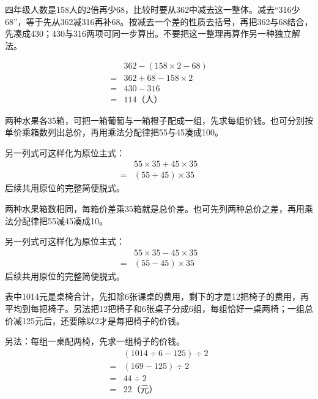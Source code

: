 \documentclass[multi=snippet,border=0pt]{standalone}
\newenvironment{snippet}[3]{\begin{minipage}{#1bp}\color{answerred}\fontsize{#2}{#3}\selectfont\raggedright}{\end{minipage}}
\begin{document}
\begin{snippet}{505}{11.5}{14}四年级人数是158人的2倍再少68，比较时要从362中减去这一整体。减去“316少68”，等于先从362减316再补68。按减去一个差的性质去括号，再把362与68结合，先凑成430；430与316两项可同一步算出。不要把这一整理再算作另一种独立解法。\end{snippet}
\begin{snippet}{179}{10.5}{12.8}\[\begin{aligned}&362-(158\times2-68)\\={}&362+68-158\times2\\={}&430-316\\={}&114\text{（人）}\end{aligned}\]\end{snippet}
\begin{snippet}{505}{11.5}{14}两种水果各35箱，可把一箱葡萄与一箱橙子配成一组，先求每组价钱。也可分别按单价乘箱数列出总价，再用乘法分配律把55与45凑成100。\par 另一列式可这样化为原位主式：\[\begin{aligned}&55\times35+45\times35\\={}&(55+45)\times35\end{aligned}\]后续共用原位的完整简便脱式。\end{snippet}
\begin{snippet}{505}{11.5}{14}两种水果箱数相同，每箱价差乘35箱就是总价差。也可先列两种总价之差，再用乘法分配律把55减45凑成10。\par 另一列式可这样化为原位主式：\[\begin{aligned}&55\times35-45\times35\\={}&(55-45)\times35\end{aligned}\]后续共用原位的完整简便脱式。\end{snippet}
\begin{snippet}{505}{11.5}{14}表中1014元是桌椅合计，先扣除6张课桌的费用，剩下的才是12把椅子的费用，再平均到每把椅子。另法把12把椅子和6张桌子分成6组，每组恰好一桌两椅；一组总价减125元后，还要除以2才是每把椅子的价钱。\par 另法：每组一桌配两椅，先求一组椅子的价钱。\[\begin{aligned}&(1014\div6-125)\div2\\={}&(169-125)\div2\\={}&44\div2\\={}&22\text{（元）}\end{aligned}\]\end{snippet}
\end{document}

